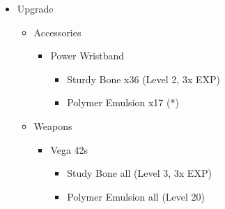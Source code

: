 \begin{upgrade}
\begin{multicols}{2}
\begin{itemize}
    \item Upgrade
    \begin{itemize}
        \item Accessories
        \begin{itemize}
            \item Power Wristband
            \begin{itemize}
                \item Sturdy Bone x36 (Level 2, 3x EXP)
                \item Polymer Emulsion x17 (*)
            \end{itemize}
        \end{itemize}
        \columnbreak
        \item Weapons
        \begin{itemize}
            \item Vega 42s
            \begin{itemize}
                \item Study Bone all (Level 3, 3x EXP)
                \item Polymer Emulsion all (Level 20)
            \end{itemize}
        \end{itemize}
    \end{itemize}
\end{itemize}
\end{multicols}
\end{upgrade}

